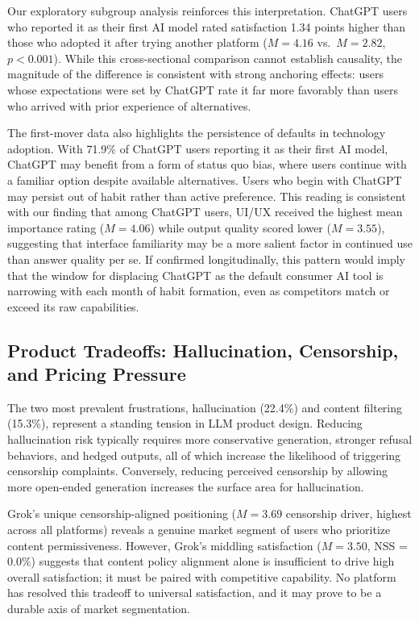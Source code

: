 \documentclass[10pt,twocolumn]{article}
\begin{document}
Our exploratory subgroup analysis reinforces this interpretation. ChatGPT users who reported it as their first AI model rated satisfaction 1.34 points higher than those who adopted it after trying another platform ($M=4.16$ vs.\ $M=2.82$, $p<0.001$). While this cross-sectional comparison cannot establish causality, the magnitude of the difference is consistent with strong anchoring effects: users whose expectations were set by ChatGPT rate it far more favorably than users who arrived with prior experience of alternatives.

The first-mover data also highlights the persistence of defaults in technology adoption. With 71.9\% of ChatGPT users reporting it as their first AI model, ChatGPT may benefit from a form of status quo bias, where users continue with a familiar option despite available alternatives. Users who begin with ChatGPT may persist out of habit rather than active preference. This reading is consistent with our finding that among ChatGPT users, UI/UX received the highest mean importance rating ($M=4.06$) while output quality scored lower ($M=3.55$), suggesting that interface familiarity may be a more salient factor in continued use than answer quality per se. If confirmed longitudinally, this pattern would imply that the window for displacing ChatGPT as the default consumer AI tool is narrowing with each month of habit formation, even as competitors match or exceed its raw capabilities.

\subsection{Product Tradeoffs: Hallucination, Censorship, and Pricing Pressure}

The two most prevalent frustrations, hallucination (22.4\%) and content filtering (15.3\%), represent a standing tension in LLM product design. Reducing hallucination risk typically requires more conservative generation, stronger refusal behaviors, and hedged outputs, all of which increase the likelihood of triggering censorship complaints. Conversely, reducing perceived censorship by allowing more open-ended generation increases the surface area for hallucination.

Grok's unique censorship-aligned positioning ($M=3.69$ censorship driver, highest across all platforms) reveals a genuine market segment of users who prioritize content permissiveness. However, Grok's middling satisfaction ($M=3.50$, NSS = 0.0\%) suggests that content policy alignment alone is insufficient to drive high overall satisfaction; it must be paired with competitive capability. No platform has resolved this tradeoff to universal satisfaction, and it may prove to be a durable axis of market segmentation.
\end{document}

